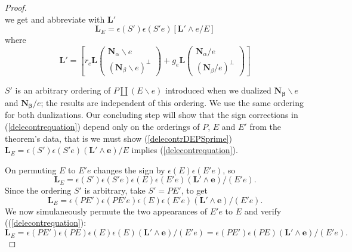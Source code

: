 \documentclass[Unicode]{cedram-alco}
\newcommand{\ext}[1]{\ensuremath{\mathbf{#1}}}
\newcommand{\eNal}{\ensuremath{\ext{N}_{\alpha}}}
\newcommand{\eNbe}{\ensuremath{\ext{N}_\beta}}
\newcommand{\dunion}{\coprod}
\begin{document}
\begin{proof}
\[       \]
we get and abbreviate with $\ext{L'}$         
\begin{equation}\label{delecontrDEPSprime}
  \ext{L}_E = \epsilon(S')\epsilon(S'e)
  \left[ \ext{L'} \wedge e /E \right]
\end{equation}
where
\[
\ext{L'} = \left[
        r_e\ext{L}\left(
        \begin{array}{c} \eNal\backslash e \\
    (\eNbe\backslash e)^\perp
    \end{array}  \right) 
+
        g_e\ext{L}\left(
        \begin{array}{c} \eNal / e \\
    (\eNbe / e)^\perp \end{array} \right) 
        \right]
\]




$S'$ is an arbitrary ordering of $P\dunion (E\backslash e)$ introduced
when we dualized $\ext{N_\beta}\backslash e$ and
$\ext{N_\beta}/ e$; the results are independent of this ordering.
We use the same ordering for both dualizations.
Our concluding
step will show that the sign corrections in (\ref{delecontrequation}) depend only
on the orderings of $P$, $E$ and $E'$ from the theorem's data, that is
we must show (\ref{delecontrDEPSprime})
$\ext{L}_E=\epsilon(S')\epsilon(S'e)(\ext{L'}\wedge \ext{e})/E$
implies (\ref{delecontrequation}).

On permuting $E$ to $E'e$ changes the sign by $\epsilon(E)\epsilon(E'e)$, so
\[
\ext{L}_E=\epsilon(S')\epsilon(S'e)\epsilon(E)\epsilon(E'e)(\ext{L'}\wedge \ext{e})/(E'e).
\]
Since the ordering $S'$ is arbitrary, take $S'=PE'$, to get
\[
\ext{L}_E=\epsilon(PE')\epsilon(PE'e)\epsilon(E)\epsilon(E'e)(\ext{L'}\wedge \ext{e})/(E'e).
\]
We now simulaneously permute the two appearances of $E'e$ to $E$ and verify ((\ref{delecontrequation}):
\[
\ext{L}_E=\epsilon(PE')\epsilon(PE)\epsilon(E)\epsilon(E)(\ext{L'}\wedge \ext{e})/(E'e)
=\epsilon(PE')\epsilon(PE)(\ext{L'}\wedge \ext{e})/(E'e).
\]


\end{proof}
\end{document}
